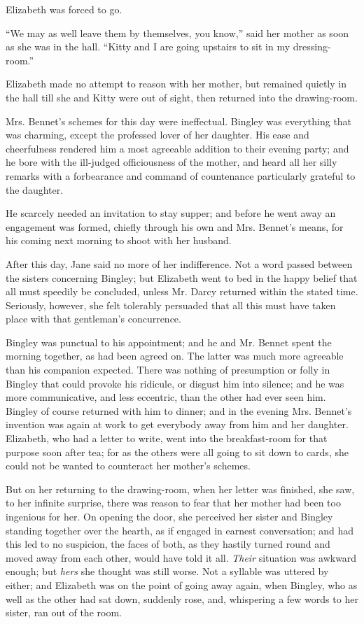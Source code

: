 \documentclass[12pt]{book}
\begin{document}
Elizabeth was forced to go.

``We may as well leave them by themselves, you know,'' said her mother as soon as she was in the hall. ``Kitty and I are going upstairs to sit in my dressing-room.''

Elizabeth made no attempt to reason with her mother, but remained quietly in the hall till she and Kitty were out of sight, then returned into the drawing-room.

Mrs. Bennet's schemes for this day were ineffectual. Bingley was everything that was charming, except the professed lover of her daughter. His ease and cheerfulness rendered him a most agreeable addition to their evening party; and he bore with the ill-judged officiousness of the mother, and heard all her silly remarks with a forbearance and command of countenance particularly grateful to the daughter.

He scarcely needed an invitation to stay supper; and before he went away an engagement was formed, chiefly through his own and Mrs. Bennet's means, for his coming next morning to shoot with her husband.

After this day, Jane said no more of her indifference. Not a word passed between the sisters concerning Bingley; but Elizabeth went to bed in the happy belief that all must speedily be concluded, unless Mr. Darcy returned within the stated time. Seriously, however, she felt tolerably persuaded that all this must have taken place with that gentleman's concurrence.

Bingley was punctual to his appointment; and he and Mr. Bennet spent the morning together, as had been agreed on. The latter was much more agreeable than his companion expected. There was nothing of presumption or folly in Bingley that could provoke his ridicule, or disgust him into silence; and he was more communicative, and less eccentric, than the other had ever seen him. Bingley of course returned with him to dinner; and in the evening Mrs. Bennet's invention was again at work to get everybody away from him and her daughter. Elizabeth, who had a letter to write, went into the breakfast-room for that purpose soon after tea; for as the others were all going to sit down to cards, she could not be wanted to counteract her mother's schemes.

But on her returning to the drawing-room, when her letter was finished, she saw, to her infinite surprise, there was reason to fear that her mother had been too ingenious for her. On opening the door, she perceived her sister and Bingley standing together over the hearth, as if engaged in earnest conversation; and had this led to no suspicion, the faces of both, as they hastily turned round and moved away from each other, would have told it all. \textit{Their} situation was awkward enough; but \textit{hers} she thought was still worse. Not a syllable was uttered by either; and Elizabeth was on the point of going away again, when Bingley, who as well as the other had sat down, suddenly rose, and, whispering a few words to her sister, ran out of the room.
\end{document}

